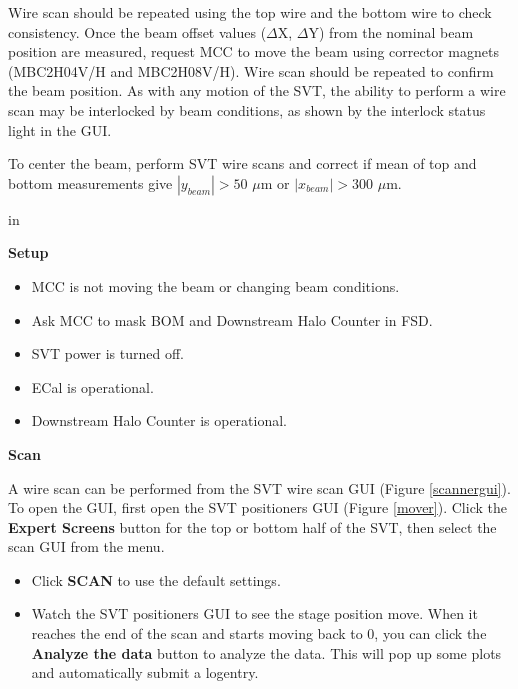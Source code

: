 \documentclass[12pt]{report}
\begin{document}
Wire scan should be repeated using the top wire and the bottom wire to check consistency. Once the beam offset values ($\Delta$X, $\Delta$Y) from the nominal beam position are measured, request MCC to move the beam using corrector magnets (MBC2H04V/H and MBC2H08V/H). Wire scan should be repeated to confirm the beam position.  As with any motion of the SVT, the ability to perform a wire scan may be interlocked by beam conditions, as shown by the interlock status light in the GUI.

To center the beam, perform SVT wire scans and correct if mean of top and bottom measurements give $|y_{beam}| > 50$ $\mu$m or $|x_{beam}| > 300$ $\mu$m. 

 in

\noindent
\textbf{Setup}

\begin{itemize}
\item
MCC is not moving the beam or changing beam conditions.
\item
Ask MCC to mask BOM and Downstream Halo Counter in FSD.
\item
SVT power is turned off.
\item
ECal is operational.
\item
Downstream Halo Counter is operational.
\end{itemize}

\noindent
\textbf{Scan}

A wire scan can be performed from the SVT wire scan GUI (Figure \ref{scannergui}). To open the GUI, first open the SVT positioners GUI (Figure \ref{mover}). Click the \textbf{Expert Screens} button for the top or bottom half of the SVT, then select the scan GUI from the menu.

\begin{itemize}
\item
Click \textbf{SCAN} to use the default settings.
\item
Watch the SVT positioners GUI to see the stage position move. When it reaches the end of the scan and starts moving back to 0, you can click the \textbf{Analyze the data} button to analyze the data. This will pop up some plots and automatically submit a logentry.
\end{itemize}
\end{document}
